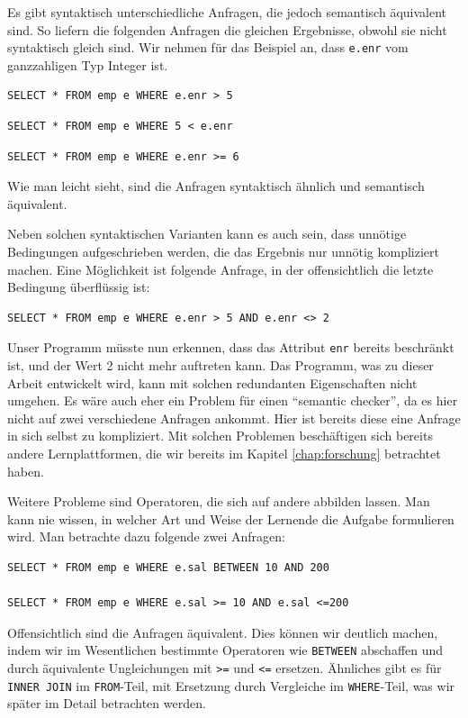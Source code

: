 Es gibt syntaktisch unterschiedliche Anfragen, die jedoch semantisch äquivalent sind. So liefern die folgenden Anfragen die gleichen Ergebnisse, obwohl sie nicht syntaktisch gleich sind. Wir nehmen für das Beispiel an, dass \verb|e.enr| vom ganzzahligen Typ Integer ist.

\begin{verbatim}
SELECT * FROM emp e WHERE e.enr > 5
\end{verbatim}

\begin{verbatim}
SELECT * FROM emp e WHERE 5 < e.enr
\end{verbatim}

\begin{verbatim}
SELECT * FROM emp e WHERE e.enr >= 6
\end{verbatim}

Wie man leicht sieht, sind die Anfragen syntaktisch ähnlich und semantisch äquivalent. 

Neben solchen syntaktischen Varianten kann es auch sein, dass unnötige Bedingungen aufgeschrieben werden, die das Ergebnis nur unnötig kompliziert machen. Eine Möglichkeit ist folgende Anfrage, in der offensichtlich die letzte Bedingung überflüssig ist:
\begin{verbatim}
SELECT * FROM emp e WHERE e.enr > 5 AND e.enr <> 2
\end{verbatim}

Unser Programm müsste nun erkennen, dass das Attribut \verb|enr| bereits beschränkt ist, und der Wert 2 nicht mehr auftreten kann. Das Programm, was zu dieser Arbeit entwickelt wird, kann mit solchen redundanten Eigenschaften nicht umgehen. Es wäre auch eher ein Problem für einen ``semantic checker'', da es hier nicht auf zwei verschiedene Anfragen ankommt. Hier ist bereits diese eine Anfrage in sich selbst zu kompliziert. Mit solchen Problemen beschäftigen sich bereits andere Lernplattformen, die wir bereits im Kapitel \ref{chap:forschung} betrachtet haben.

Weitere Probleme sind Operatoren, die sich auf andere abbilden lassen. Man kann nie wissen, in welcher Art und Weise der Lernende die Aufgabe formulieren wird. Man betrachte dazu folgende zwei Anfragen:
\begin{verbatim}
SELECT * FROM emp e WHERE e.sal BETWEEN 10 AND 200

SELECT * FROM emp e WHERE e.sal >= 10 AND e.sal <=200
\end{verbatim}

Offensichtlich sind die Anfragen äquivalent. Dies können wir deutlich machen, indem wir im Wesentlichen bestimmte Operatoren wie \verb|BETWEEN| abschaffen und durch äquivalente Ungleichungen mit \verb|>=| und \verb|<=| ersetzen. Ähnliches gibt es für \verb|INNER JOIN| im \verb|FROM|-Teil, mit Ersetzung durch Vergleiche im \verb|WHERE|-Teil, was wir später im Detail betrachten werden.

